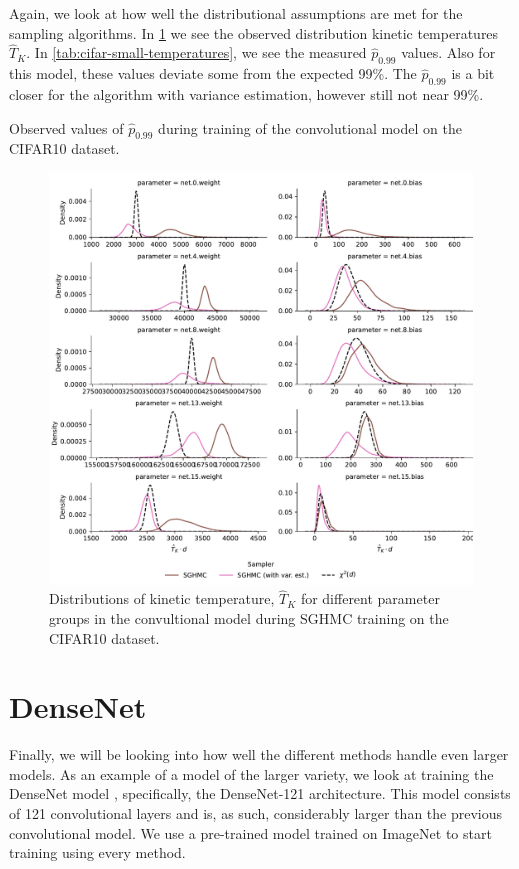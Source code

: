 Again, we look at how well the distributional assumptions are met for the sampling algorithms.
In \cref{fig:cifar-small-temperatures} we see the observed distribution kinetic temperatures $\hat{T}_K$. 
In \cref{tab:cifar-small-temperatures}, we see the measured $\hat p_{0.99}$ values.
Also for this model, these values deviate some from the expected 99\%.
The $\hat p_{0.99}$ is a bit closer for the algorithm with variance estimation, however still not near 99\%.
\begin{table}[htbp]
    \centering
    
    \caption{Observed values of $\hat{p}_{0.99}$ during training of the convolutional model on the CIFAR10 dataset.}
    \label{tab:cifar-small-temperatures}
\end{table}
\begin{figure}[htbp]
    \centering
    \includegraphics[width=\linewidth]{Figures/cifar-small-temperatures.pdf}
    \caption{Distributions of kinetic temperature, $\hat{T}_K$ for different parameter groups in the convultional model during SGHMC training on the CIFAR10 dataset.}
    \label{fig:cifar-small-temperatures}
\end{figure}

\FloatBarrier
\section{DenseNet}
Finally, we will be looking into how well the different methods handle even larger models.
As an example of a model of the larger variety, we look at training the DenseNet model \cite{huang_densely_2017}, specifically, the DenseNet-121 architecture. 
This model consists of 121 convolutional layers and is, as such, considerably larger than the previous convolutional model. 
We use a pre-trained model trained on ImageNet to start training using every method.

